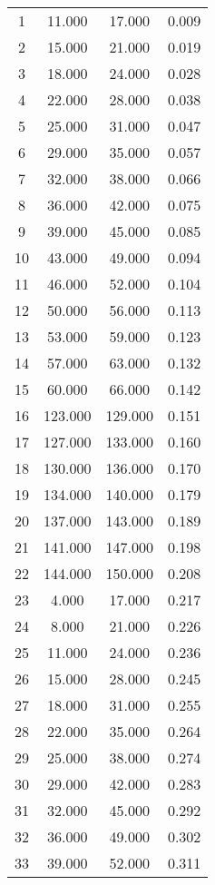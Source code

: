 % 
\begin{tabular}{cccc}
  \hline
  \hline
1 & 11.000 & 17.000 & 0.009 \\ 
  2 & 15.000 & 21.000 & 0.019 \\ 
  3 & 18.000 & 24.000 & 0.028 \\ 
  4 & 22.000 & 28.000 & 0.038 \\ 
  5 & 25.000 & 31.000 & 0.047 \\ 
  6 & 29.000 & 35.000 & 0.057 \\ 
  7 & 32.000 & 38.000 & 0.066 \\ 
  8 & 36.000 & 42.000 & 0.075 \\ 
  9 & 39.000 & 45.000 & 0.085 \\ 
  10 & 43.000 & 49.000 & 0.094 \\ 
  11 & 46.000 & 52.000 & 0.104 \\ 
  12 & 50.000 & 56.000 & 0.113 \\ 
  13 & 53.000 & 59.000 & 0.123 \\ 
  14 & 57.000 & 63.000 & 0.132 \\ 
  15 & 60.000 & 66.000 & 0.142 \\ 
  16 & 123.000 & 129.000 & 0.151 \\ 
  17 & 127.000 & 133.000 & 0.160 \\ 
  18 & 130.000 & 136.000 & 0.170 \\ 
  19 & 134.000 & 140.000 & 0.179 \\ 
  20 & 137.000 & 143.000 & 0.189 \\ 
  21 & 141.000 & 147.000 & 0.198 \\ 
  22 & 144.000 & 150.000 & 0.208 \\ 
  23 & 4.000 & 17.000 & 0.217 \\ 
  24 & 8.000 & 21.000 & 0.226 \\ 
  25 & 11.000 & 24.000 & 0.236 \\ 
  26 & 15.000 & 28.000 & 0.245 \\ 
  27 & 18.000 & 31.000 & 0.255 \\ 
  28 & 22.000 & 35.000 & 0.264 \\ 
  29 & 25.000 & 38.000 & 0.274 \\ 
  30 & 29.000 & 42.000 & 0.283 \\ 
  31 & 32.000 & 45.000 & 0.292 \\ 
  32 & 36.000 & 49.000 & 0.302 \\ 
  33 & 39.000 & 52.000 & 0.311 \\ 

\end{tabular}
